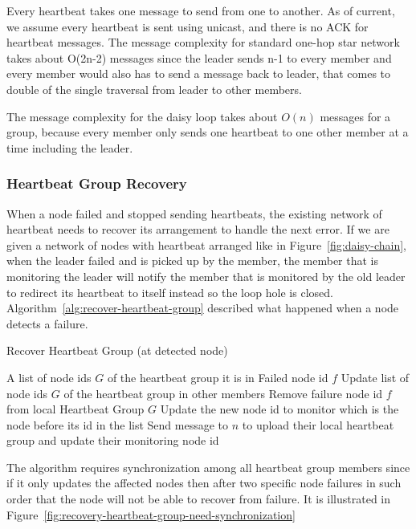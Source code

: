 Every heartbeat takes one message to send from one to another. As of current,
we assume every heartbeat is sent using unicast, and there is no ACK for
heartbeat messages. The message complexity for standard one-hop star
network takes about
O(2n-2) messages since the leader sends n-1 to every member and every
member would also has to send a message back to leader, that comes to
double of the single traversal from leader to other members.

The message complexity for the daisy loop takes about $O(n)$ messages for
a group, because every member only sends one heartbeat to one other member at
a time including the leader.

\subsubsection{Heartbeat Group Recovery}

When a node failed and stopped sending heartbeats, the existing network of
heartbeat needs to recover its arrangement to handle the next error. If we are
given a network of nodes with heartbeat arranged like in
Figure~\ref{fig:daisy-chain}, when the leader failed and is picked up by the
member, the member that is monitoring the leader will notify the member that is
monitored by the old leader to redirect its heartbeat to itself instead so the
loop hole is closed. Algorithm~\ref{alg:recover-heartbeat-group} described what
happened when a node detects a failure.

\begin{algorithm}
\caption{Recover Heartbeat Group (at detected node)}
\label{alg:recover-heartbeat-group}
\begin{algorithmic}
\Require A list of node ids $G$ of the heartbeat group it is in
\Require Failed node id $f$
\Ensure Update list of node ids $G$ of the heartbeat group in other members
\State Remove failure node id $f$ from local Heartbeat Group $G$
\State Update the new node id to monitor which is the node before its id in the
list
  \State Send message to $n$ to upload their local heartbeat group and update
  their monitoring node id
\EndFor
\end{algorithmic}
\end{algorithm}

The algorithm requires synchronization among all heartbeat group members since
if it only updates the affected nodes then after two specific node failures in
such order that the node will not be able to recover from failure. It is
illustrated in Figure~\ref{fig:recovery-heartbeat-group-need-synchronization}

